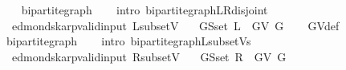 \begin{isabellebody}
\endisataginvisible
{\isafoldinvisible}%
%
\isadeliminvisible
\isanewline
%
\endisadeliminvisible
%
\isadelimproof
\ \ %
\endisadelimproof
%
\isatagproof
{}\isamarkupfalse%
\ bipartite{\isacharunderscore}{\kern0pt}graph\isanewline
\ \ \isamarkupfalse%
\ {\isacharparenleft}{\kern0pt}intro\ bipartite{\isacharunderscore}{\kern0pt}graph{\isachardot}{\kern0pt}L{\isacharunderscore}{\kern0pt}R{\isacharunderscore}{\kern0pt}disjoint{\isacharparenright}{\kern0pt}%
\endisatagproof
{\isafoldproof}%
%
\isadelimproof
\isanewline
%
\endisadelimproof
%
\isadeliminvisible
\isanewline
%
\endisadeliminvisible
%
\isataginvisible
{}\isamarkupfalse%
\ {\isacharparenleft}{\kern0pt}\ edmonds{\isacharunderscore}{\kern0pt}karp{\isacharunderscore}{\kern0pt}valid{\isacharunderscore}{\kern0pt}input{\isacharparenright}{\kern0pt}\ L{\isacharunderscore}{\kern0pt}subset{\isacharunderscore}{\kern0pt}V{\isacharcolon}{\kern0pt}\isanewline
\ \ \ {\isachardoublequoteopen}G{\isachardot}{\kern0pt}S{\isachardot}{\kern0pt}set\ L\ {\isasymsubseteq}\ G{\isachardot}{\kern0pt}V\ G{\isachardoublequoteclose}%
\endisataginvisible
{\isafoldinvisible}%
%
\isadeliminvisible
\isanewline
%
\endisadeliminvisible
%
\isadelimproof
\ \ %
\endisadelimproof
%
\isatagproof
{}\isamarkupfalse%
\ G{\isachardot}{\kern0pt}V{\isacharunderscore}{\kern0pt}def\isanewline
\ \ \isamarkupfalse%
\ bipartite{\isacharunderscore}{\kern0pt}graph\isanewline
\ \ \isamarkupfalse%
\ {\isacharparenleft}{\kern0pt}intro\ bipartite{\isacharunderscore}{\kern0pt}graph{\isachardot}{\kern0pt}L{\isacharunderscore}{\kern0pt}subset{\isacharunderscore}{\kern0pt}Vs{\isacharparenright}{\kern0pt}%
\endisatagproof
{\isafoldproof}%
%
\isadelimproof
\isanewline
%
\endisadelimproof
%
\isadeliminvisible
\isanewline
%
\endisadeliminvisible
%
\isataginvisible
{}\isamarkupfalse%
\ {\isacharparenleft}{\kern0pt}\ edmonds{\isacharunderscore}{\kern0pt}karp{\isacharunderscore}{\kern0pt}valid{\isacharunderscore}{\kern0pt}input{\isacharparenright}{\kern0pt}\ R{\isacharunderscore}{\kern0pt}subset{\isacharunderscore}{\kern0pt}V{\isacharcolon}{\kern0pt}\isanewline
\ \ \ {\isachardoublequoteopen}G{\isachardot}{\kern0pt}S{\isachardot}{\kern0pt}set\ R\ {\isasymsubseteq}\ G{\isachardot}{\kern0pt}V\ G{\isachardoublequoteclose}%
\endisataginvisible
{\isafoldinvisible}%
%
\isadeliminvisible
\isanewline
%
\endisadeliminvisible
%
\isadelimproof
\ \ %
\endisadelimproof
%
\isatagproof
{}\isamarkupfalse%

\end{isabellebody}
